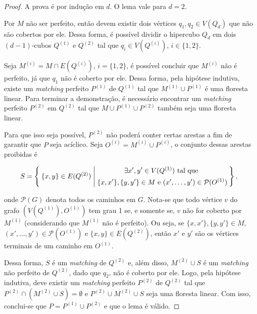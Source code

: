 \documentclass[12pt, a4paper]{article}
\begin{document}
\begin{proof}
    A prova é por indução em $d$. O lema vale para $d = 2$.
    
    Por $M$ não ser perfeito, então devem existir dois vértices $q_1, q_2 \in V(Q_d)$ que não são cobertos por ele. Dessa forma, é possível dividir o hipercubo $Q_d$ em dois $(d-1)$-cubos $Q^{(1)}$ e $Q^{(2)}$ tal que $q_i \in V(Q^{(i)})$, $i \in \{ 1, 2 \}$. 

    Seja $M^{(i)} = M \cap E(Q^{(i)})$, $i = \{ 1, 2 \}$, é possível concluir que $M^{(i)}$ não é perfeito, já que $q_1$ não é coberto por ele. Dessa forma, pela hipótese indutiva, existe um \textit{matching} perfeito $P^{(1)}$ de $Q^{(1)}$ tal que $M^{(1)} \cup P^{(1)}$ é uma floresta linear. Para terminar a demonstração, é necessário encontrar um \textit{matching} perfeito $P^{(2)}$ em $Q^{(2)}$ tal que $M \cup P^{(1)} \cup P^{(2)}$ também seja uma floresta linear.

    Para que isso seja possível, $P^{(2)}$ não poderá conter certas arestas a fim de garantir que $P$ seja acíclico. Seja $O^{(i)} = M^{(i)} \cup P^{(i)}$, o conjunto dessas arestas proibidas é

    $$
    S = \Set{
    \{ x, y \} \in E(Q^{(2)}) |
    \begin{gathered}
    \exists x', y' \in V(Q^{(1)}) \text{ tal que } \\
    \{ x, x' \}, \{ y, y' \} \in M \text{ e }
    (x', \dots, y') \in \mathcal{P}(O^{(1)})
    \end{gathered}
    },
    $$

    \noindent onde $\mathcal{P}(G)$ denota todos os caminhos em $G$. Nota-se que todo vértice $v$ do grafo $(V(Q^{(1)}), O^{(1)})$ tem grau 1 se, e somente se, $v$ não for coberto por $M^{(1)}$ (considerando que $M^{(1)}$ não é perfeito). Ou seja, se $\{ x, x' \}, \{ y, y' \} \in M$, $(x', \dots, y') \in \mathcal{P}(O^{(1)})$ e $\{ x, y \} \in E(Q^{(2)})$, então $x'$ e $y'$ são os vértices terminais de um caminho em $O^{(1)}$.

    Dessa forma, $S$ é um \textit{matching} de $Q^{(2)}$ e, além disso, $M^{(2)} \cup S$ é um \textit{matching} não perfeito de $Q^{(2)}$, dado que $q_2$, não é coberto por ele. Logo, pela hipótese indutiva, deve existir um \textit{matching} perfeito $P^{(2)}$ de $Q^{(2)}$ tal que $P^{(2)} \cap (M^{(2)} \cup S) = \emptyset$ e $P^{(2)} \cup M^{(2)} \cup S$ seja uma floresta linear. Com isso, conclui-se que $P = P^{(1)} \cup P^{(2)}$ e que o lema é válido.
\end{proof}
\end{document}
